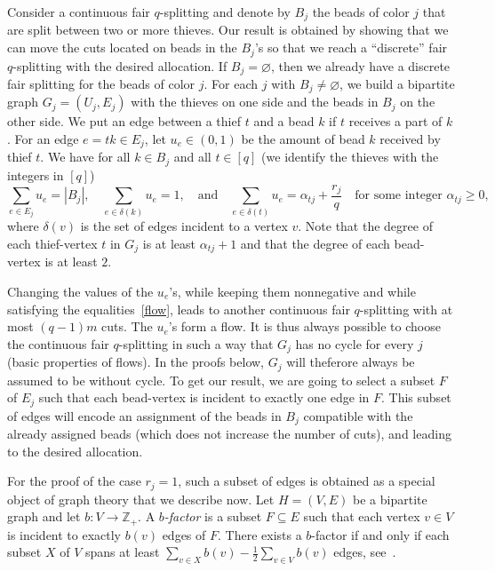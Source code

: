 \documentclass[12pt]{amsart}
\theoremstyle{remark}
\def\Z{\mathbb{Z}}
\begin{document}
Consider a continuous fair $q$-splitting and denote by $B_j$ the beads of color $j$ that are split between two or more thieves. Our result is obtained by showing that we can move the cuts located on beads in the $B_j$'s so that we reach a ``discrete'' fair $q$-splitting with the desired allocation. If $B_j=\varnothing$, then we already have a discrete fair splitting for the beads of color $j$. For each $j$ with $B_j\neq\varnothing$, we build a bipartite graph $G_j=(U_j,E_j)$ with the thieves on one side and the beads in $B_j$ on the other side. We put an edge between a thief $t$ and a bead $k$ if $t$ receives a part of $k$. For an edge $e=tk\in E_j$, let $u_e\in(0,1)$ be the amount of bead $k$ received by thief $t$. We have for all $k\in B_j$ and all $t\in[q]$ (we identify the thieves with the integers in $[q]$)
\begin{equation}\label{flow}
\sum_{e\in E_j}u_e=|B_j|,\quad\sum_{e\in\delta(k)}u_e=1,\quad\mbox{and}\quad\sum_{e\in\delta(t)}u_e=\alpha_{tj}+\frac {r_j} q\quad\mbox{for some integer $\alpha_{tj}\geq 0$,}
\end{equation} where $\delta(v)$ is the set of edges incident to a vertex $v$. Note that the degree of each thief-vertex $t$ in $G_j$ is at least $\alpha_{tj}+1$ and that the degree of each bead-vertex is at least $2$.

Changing the values of the $u_e$'s, while keeping them nonnegative and while satisfying the equalities~\eqref{flow}, leads to another continuous fair $q$-splitting with at most $(q-1)m$ cuts. The $u_e$'s form a flow. It is thus always possible to choose the continuous fair $q$-splitting in such a way that $G_j$ has no cycle for every $j$ (basic properties of flows). In the proofs below, $G_j$ will theferore always be assumed to be without cycle.
To get our result, we are going to select a subset $F$ of $E_j$ such that each bead-vertex is incident to exactly one edge in $F$. This subset of edges will encode an assignment of the beads in $B_j$ compatible with the already assigned beads (which does not increase the number of cuts), and leading to the desired allocation. 

For the proof of the case $r_j=1$, such a subset of edges is obtained as a special object of graph theory that we describe now.
Let $H=(V,E)$ be a bipartite graph and let $b:V\rightarrow\Z_+$. A {\em $b$-factor} is a subset $F\subseteq E$ such that each vertex $v\in V$ is incident to exactly $b(v)$ edges of $F$. There exists a $b$-factor if and only if each subset $X$ of $V$ spans at least $\sum_{v\in X}b(v)-\frac 1 2 \sum_{v\in V}b(v)$ edges, see~\cite[Corollary 21.4a]{schrijver2002combinatorial}.
\end{document}
